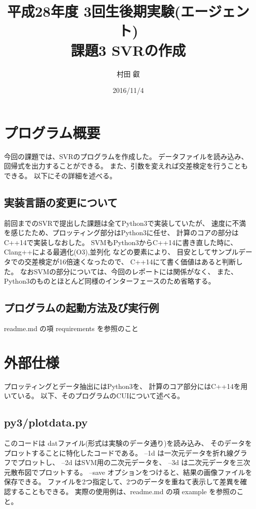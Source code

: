\documentclass[]{jsarticle}
\begin{document}
\title{平成28年度 3回生後期実験(エージェント) \\ 課題3 SVRの作成 }
\author{村田 叡}
\date{ 2016/11/4 }
\maketitle

\section{プログラム概要}
今回の課題では、SVRのプログラムを作成した。
データファイルを読み込み、回帰式を出力することができる。
また、引数を変えれば交差検定を行うこともできる。
以下にその詳細を述べる。


\subsection{実装言語の変更について}
前回までのSVRで提出した課題は全てPython3で実装していたが、
速度に不満を感じたため、プロッティング部分はPython3に任せ、
計算のコアの部分はC++14で実装しなおした。
SVMもPython3からC++14に書き直した時に、
Clang++による最適化(O3),並列化 などの要素により、
目安としてサンプルデータでの交差検定が16倍速くなったので、
C++14にて書く価値はあると判断した。
なおSVMの部分については、今回のレポートには関係がなく、
また、Python3のものとほとんど同様のインターフェースのため省略する。

\subsection{プログラムの起動方法及び実行例}
readme.md  の項 requirements を参照のこと

\section{外部仕様}
プロッティングとデータ抽出にはPython3を、
計算のコア部分にはC++14を用いている。
以下、そのプログラムのCUIについて述べる。

\subsection{py3/plotdata.py}
このコードは datファイル(形式は実験のデータ通り)を読み込み、
そのデータをプロットすることに特化したコードである。
--1d は一次元データを折れ線グラフでプロットし、
--2d はSVM用の二次元データを、
--3d は二次元データを三次元散布図でプロットする。
--save オプションをつけると、結果の画像ファイルを保存できる。
ファイルを2つ指定して、2つのデータを重ねて表示して差異を確認することもできる。
実際の使用例は、readme.md の項 example を参照のこと。
\end{document}
